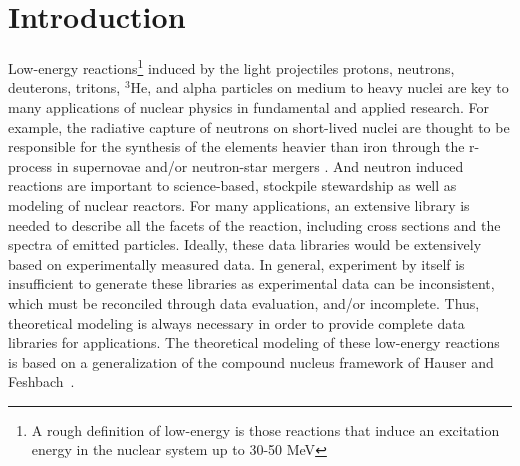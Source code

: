 \documentclass[
10pt,
showpacs,preprintnumbers,footinbib,
amsfonts,amsmath,amssymb,
aps,
prc,twocolumn,groupedaddress,superscriptaddress,
showkeys,
nofootinbib
]{revtex4-1}
\begin{document}
\section{Introduction}
Low-energy reactions\footnote{A rough definition of low-energy is those reactions that induce an excitation energy in the nuclear system up to 30-50 MeV} induced by the light projectiles protons, neutrons, deuterons, tritons, $^3$He, and alpha particles on medium to heavy nuclei are key to many applications of nuclear physics in fundamental and applied research.  For example, the radiative capture of neutrons on short-lived nuclei are thought to be responsible for the synthesis of the elements heavier than iron through the r-process \cite{Bur:1957} in supernovae and/or neutron-star mergers \cite{Kas:2017}. And neutron induced reactions are important to science-based, stockpile stewardship as well as modeling of nuclear reactors. For many applications, an extensive library is needed to describe all the facets of the reaction, including cross sections and the spectra of emitted particles. Ideally, these data libraries would be extensively based on experimentally measured data. In general, experiment by itself is insufficient to generate these libraries as experimental data can be inconsistent, which must be reconciled through data evaluation, and/or incomplete. Thus, theoretical modeling is always necessary in order to provide complete data libraries for applications. The theoretical modeling of these low-energy reactions is based on a generalization of the compound nucleus framework of Hauser and Feshbach~\cite{Hauser:1952}. 
\end{document}
